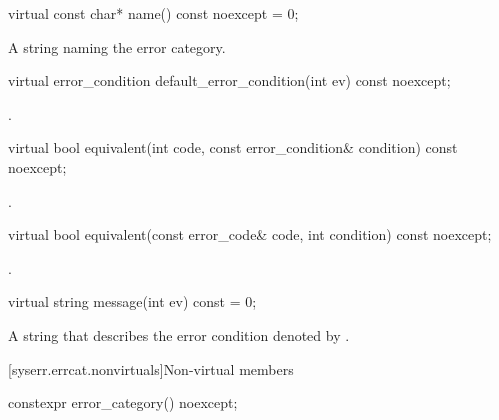 %
\begin{itemdecl}
virtual const char* name() const noexcept = 0;
\end{itemdecl}

\begin{itemdescr}
\pnum
\returns A string naming the error category.
\end{itemdescr}

%
\begin{itemdecl}
virtual error_condition default_error_condition(int ev) const noexcept;
\end{itemdecl}

\begin{itemdescr}
\pnum
\returns
{}.
\end{itemdescr}

%
\begin{itemdecl}
virtual bool equivalent(int code, const error_condition& condition) const noexcept;
\end{itemdecl}

\begin{itemdescr}
\pnum
\returns {}.
\end{itemdescr}

%
\begin{itemdecl}
virtual bool equivalent(const error_code& code, int condition) const noexcept;
\end{itemdecl}

\begin{itemdescr}
\pnum
\returns {}.
\end{itemdescr}

%
\begin{itemdecl}
virtual string message(int ev) const = 0;
\end{itemdecl}

\begin{itemdescr}
\pnum
\returns A string that describes the error condition denoted by .
\end{itemdescr}

[syserr.errcat.nonvirtuals]{Non-virtual members}

%
\begin{itemdecl}
constexpr error_category() noexcept;
\end{itemdecl}

